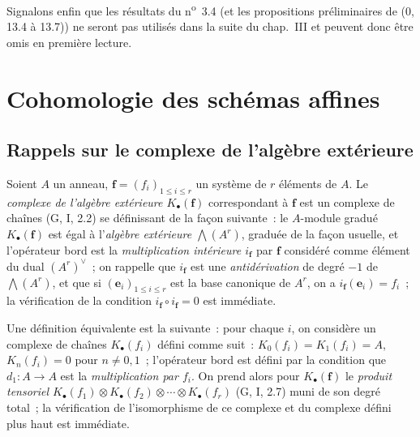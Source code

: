 Signalons enfin que les résultats du n\textsuperscript{o}~3.4 (et les
propositions préliminaires de (0, 13.4 à 13.7)) ne seront pas utilisés dans la
suite du chap.~III et peuvent donc être omis en première lecture.

\setcounter{section}{0}
\section{Cohomologie des schémas affines}
\label{section:III.1-fr}

\subsection{Rappels sur le complexe de l'algèbre extérieure}
\label{subsection:III.1.1-fr}

\begin{env}[1.1.1]
\label{III.1.1.1-fr}
Soient $A$ un anneau, $\mathbf f=(f_i)_{1\leq i\leq r}$ un système de $r$
éléments de $A$. Le \emph{complexe de l'algèbre extérieure
$K_\bullet(\mathbf f)$} correspondant à $\mathbf f$ est un complexe de chaînes
(G, I, 2.2) se définissant de la façon suivante~: le $A$-module gradué
$K_\bullet(\mathbf f)$ est égal à l'\emph{algèbre extérieure
$\bigwedge(A^r)$}, graduée de la façon usuelle, et l'opérateur bord est la
\emph{multiplication intérieure $i_{\mathbf f}$} par $\mathbf f$ considéré
comme élément du dual $(A^r)^\vee$~; on rappelle que $i_{\mathbf f}$ est une
\emph{antidérivation} de degré $-1$ de $\bigwedge(A^r)$, et que si
$(\mathbf e_i)_{1\leq i\leq r}$ est la base canonique de $A^r$, on a
$i_{\mathbf f}(\mathbf e_i)=f_i$~; la vérification de la condition
$i_{\mathbf f}\circ i_{\mathbf f}=0$ est immédiate.

Une définition équivalente est la suivante~: pour chaque $i$, on considère
un complexe de chaînes $K_\bullet(f_i)$ défini comme suit~:
$K_0(f_i)=K_1(f_i)=A$, $K_n(f_i)=0$ pour $n\neq0,1$~; l'opérateur bord est
défini par la condition que $d_1:A\to A$ est la \emph{multiplication par
$f_i$}. On prend alors pour $K_\bullet(\mathbf f)$ le \emph{produit tensoriel
$K_\bullet(f_1)\otimes K_\bullet(f_2)\otimes\cdots\otimes K_\bullet(f_r)$}
(G, I, 2.7) muni de son degré total~; la vérification de l'isomorphisme de ce
complexe et du complexe défini plus haut est immédiate.
\end{env}

